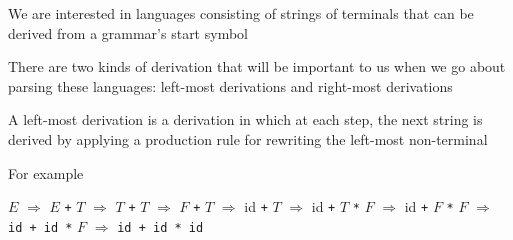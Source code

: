 \documentclass[8pt,a4paper,compress,handout]{beamer}
\newcommand{\mm}[1]{$#1$}
\newenvironment{spaced}
{
\smallskip
\hspace{.5cm}
\begin{minipage}[c]{\textwidth}
}
{
\end{minipage}
\smallskip
}
\begin{document}
\begin{frame}[fragile]
\pause

We are interested in languages consisting of strings of terminals that can be derived from a grammar's start symbol

\pause
\bigskip

There are two kinds of derivation that will be important to us when we go about parsing these languages: left-most derivations and right-most derivations

\pause
\bigskip

A left-most derivation is a derivation in which at each step, the next string is derived by applying a production rule for rewriting the left-most non-terminal

\pause
\bigskip

For example

\text{ }
\begin{spaced}
\begin{production}
\underline{\mm{E}} \mm{\Rightarrow} \underline{\mm{E}} \lstinline{+} \mm{T}
   \mm{\Rightarrow} \underline{\mm{T}} \lstinline{+} \mm{T}
   \mm{\Rightarrow} \underline{\mm{F}} \lstinline{+} \mm{T}
   \mm{\Rightarrow} id \lstinline{+} \underline{\mm{T}}
   \mm{\Rightarrow} id \lstinline{+} \underline{\mm{T}} \lstinline{*} \mm{F}
   \mm{\Rightarrow} id \lstinline{+} \underline{\mm{F}} \lstinline{*} \mm{F}
   \mm{\Rightarrow} \lstinline{id + id *} \underline{\mm{F}}
   \mm{\Rightarrow} \lstinline{id + id * id}
\end{production}
\end{spaced}
\end{frame}
\end{document}
